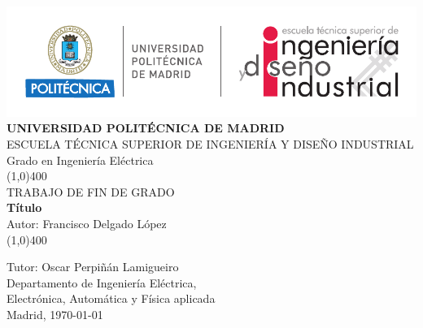 \begin{center}
\thispagestyle{empty}
\includegraphics[scale=1]{figuras/cabecera.pdf}\\
\vspace*{1cm}
\Large{\textbf{\MakeUppercase{Universidad Politécnica de Madrid}}}\\[3mm]
\Large{{\MakeUppercase{Escuela técnica superior de ingeniería y diseño industrial}}}\\[3mm]
\Large {Grado en Ingeniería Eléctrica}\\
\vfill
\line(1,0){400}\\
\Large{{\MakeUppercase{Trabajo de fin de grado}}}\\
\Huge{\textbf{Título}}\\[5mm]
\Large{Autor: Francisco Delgado López}\\
\line(1,0){400}\\
\vfill
\end{center}
\begin{flushright}
\Large {Tutor: Oscar Perpiñán Lamigueiro}\\[3mm]
\Large{Departamento de Ingeniería Eléctrica,\\ Electrónica, Automática y Física aplicada}\\[10mm]
Madrid, \today
\end{flushright}
\cleardoublepage 
